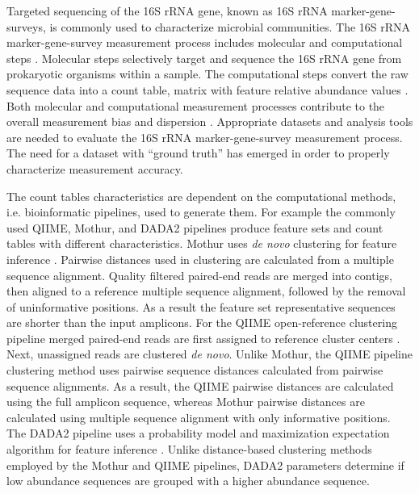 \documentclass{bmcart}
\begin{document}
Targeted sequencing of the 16S rRNA gene, known as 16S rRNA
marker-gene-surveys, is commonly used to characterize
microbial communities. The 16S rRNA marker-gene-survey
measurement process includes molecular and
computational steps \cite{Goodrich2014}.
Molecular steps selectively target and sequence the 16S rRNA
gene from prokaryotic organisms within a sample. The computational steps
convert the raw sequence data into a count table, matrix with feature relative abundance values
\cite{Goodrich2014}. Both molecular and computational measurement
processes contribute to the overall measurement bias and dispersion
\cite{Amore2016, Goodrich2014, brooks2015truth}. Appropriate
datasets and analysis tools are needed to evaluate the 16S rRNA
marker-gene-survey measurement process. The need for a  dataset with
``ground truth'' has emerged in order to properly characterize measurement accuracy.

The count tables characteristics are dependent on the computational methods, i.e. bioinformatic pipelines, used to generate them.
For example the commonly used QIIME, Mothur, and
DADA2 pipelines produce feature sets and count tables with different characteristics. 
Mothur uses \emph{de novo} clustering for feature
inference \cite{westcott2017opticlust, schloss2009introducing}.
Pairwise distances used in clustering are calculated from a multiple
sequence alignment. Quality filtered paired-end reads are merged
into contigs, then aligned to a reference multiple
sequence alignment, followed by the removal of uninformative positions.
As a result the feature set representative sequences are shorter than the input amplicons. 
For the QIIME open-reference clustering pipeline merged paired-end reads are first assigned to reference cluster
centers \cite{Rideout2014, Caporaso2010}. 
Next, unassigned reads are clustered \emph{de novo}. 
Unlike Mothur, the QIIME pipeline clustering method uses pairwise sequence distances calculated from pairwise sequence alignments. 
As a result, the QIIME pairwise distances are calculated using the full amplicon sequence, 
whereas Mothur pairwise distances are calculated using multiple sequence alignment with only informative positions.
The DADA2 pipeline uses a probability model and maximization expectation algorithm for feature inference \cite{callahan2016dada2}. 
Unlike distance-based clustering methods employed by the Mothur and QIIME pipelines, 
DADA2 parameters determine if low abundance sequences are grouped with a higher abundance sequence.
\end{document}
